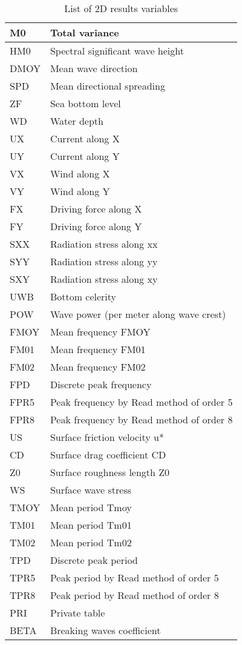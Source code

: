 \begin{table}
\begin{tabular}{|p{1.4in}|p{2.1in}|} \hline
M0 &  Total variance \\ \hline
HM0  &  Spectral significant wave height  \\ \hline
DMOY  &  Mean wave direction  \\ \hline
SPD  &  Mean directional spreading  \\ \hline
ZF &  Sea bottom level  \\ \hline
WD &  Water depth  \\ \hline
UX &  Current along X  \\ \hline
UY &  Current along Y  \\ \hline
VX &  Wind along X  \\ \hline
VY &  Wind along Y  \\ \hline
FX &  Driving force along X  \\ \hline
FY &  Driving force along Y  \\ \hline
SXX  &  Radiation stress along xx  \\ \hline
SYY  &  Radiation stress along yy  \\ \hline
SXY  &  Radiation stress along xy  \\ \hline
UWB  &  Bottom celerity  \\ \hline
POW  &  Wave power (per meter along wave crest)  \\ \hline
FMOY  &  Mean frequency FMOY  \\ \hline
FM01  &  Mean frequency FM01  \\ \hline
FM02  &  Mean frequency FM02  \\ \hline
FPD  &  Discrete peak frequency  \\ \hline
FPR5  &  Peak frequency by Read method of order 5  \\ \hline
FPR8  &  Peak frequency by Read method of order 8  \\ \hline
US &  Surface friction velocity u*  \\ \hline
CD &  Surface drag coefficient CD  \\ \hline
Z0 &  Surface roughness length Z0  \\ \hline
WS &  Surface wave stress  \\ \hline
TMOY  &  Mean period Tmoy  \\ \hline
TM01  &  Mean period Tm01  \\ \hline
TM02  &  Mean period Tm02  \\ \hline
TPD  &  Discrete peak period  \\ \hline
TPR5  &  Peak period by Read method of order 5  \\ \hline
TPR8  &  Peak period by Read method of order 8  \\ \hline
PRI  &  Private table  \\ \hline
BETA &  Breaking waves coefficient \\ \hline
\end{tabular}
\caption{\label{tab:resultvar}List of 2D results variables}
\end{table}


